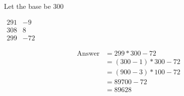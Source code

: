 Let the base be 300

$
\begin{matrix}
    291 & -9 \\
    308 & 8 \\
    \hline
    299 & -72
\end{matrix}
$

\begin{align*}
    \text{Answer} &= 299 * 300 - 72 \\
    &= (300 - 1) * 300 - 72 \\
    &= (900 - 3) * 100 - 72 \\
    &= 89700 - 72 \\
    &= 89628
\end{align*}
